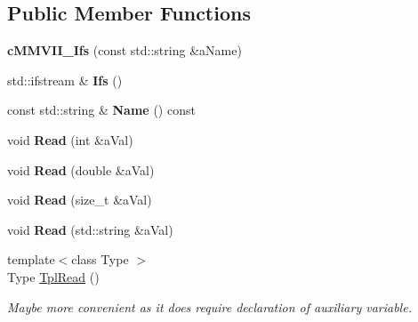\subsection*{Public Member Functions}
\begin{DoxyCompactItemize}
\item 
{\bfseries c\+M\+M\+V\+I\+I\+\_\+\+Ifs} (const std\+::string \&a\+Name)\hypertarget{classMMVII_1_1cMMVII__Ifs_aef8e07e826aff511445f4a1d83c9aa44}{}\label{classMMVII_1_1cMMVII__Ifs_aef8e07e826aff511445f4a1d83c9aa44}

\item 
std\+::ifstream \& {\bfseries Ifs} ()\hypertarget{classMMVII_1_1cMMVII__Ifs_ad0fc772b4be914156b09c153bdd7c2df}{}\label{classMMVII_1_1cMMVII__Ifs_ad0fc772b4be914156b09c153bdd7c2df}

\item 
const std\+::string \& {\bfseries Name} () const \hypertarget{classMMVII_1_1cMMVII__Ifs_a2851b7b16ce31253816df3901e3f45f2}{}\label{classMMVII_1_1cMMVII__Ifs_a2851b7b16ce31253816df3901e3f45f2}

\item 
void {\bfseries Read} (int \&a\+Val)\hypertarget{classMMVII_1_1cMMVII__Ifs_ae1cef795b03a34b48bfd71dc69617038}{}\label{classMMVII_1_1cMMVII__Ifs_ae1cef795b03a34b48bfd71dc69617038}

\item 
void {\bfseries Read} (double \&a\+Val)\hypertarget{classMMVII_1_1cMMVII__Ifs_ab7e3c52d440928f16a9859ad3e2067e3}{}\label{classMMVII_1_1cMMVII__Ifs_ab7e3c52d440928f16a9859ad3e2067e3}

\item 
void {\bfseries Read} (size\+\_\+t \&a\+Val)\hypertarget{classMMVII_1_1cMMVII__Ifs_a1210163fa4c2d316b1a8943d3e5f61f2}{}\label{classMMVII_1_1cMMVII__Ifs_a1210163fa4c2d316b1a8943d3e5f61f2}

\item 
void {\bfseries Read} (std\+::string \&a\+Val)\hypertarget{classMMVII_1_1cMMVII__Ifs_a8e3db889e619e40ef0cf6e78daeb9956}{}\label{classMMVII_1_1cMMVII__Ifs_a8e3db889e619e40ef0cf6e78daeb9956}

\item 
{\footnotesize template$<$class Type $>$ }\\Type \hyperlink{classMMVII_1_1cMMVII__Ifs_a715fd1cb2f1b02e8d8b8a40aaec2c253}{Tpl\+Read} ()\hypertarget{classMMVII_1_1cMMVII__Ifs_a715fd1cb2f1b02e8d8b8a40aaec2c253}{}\label{classMMVII_1_1cMMVII__Ifs_a715fd1cb2f1b02e8d8b8a40aaec2c253}

\begin{DoxyCompactList}\small\item\em Maybe more convenient as it does require declaration of auxiliary variable. \end{DoxyCompactList}\end{DoxyCompactItemize}
